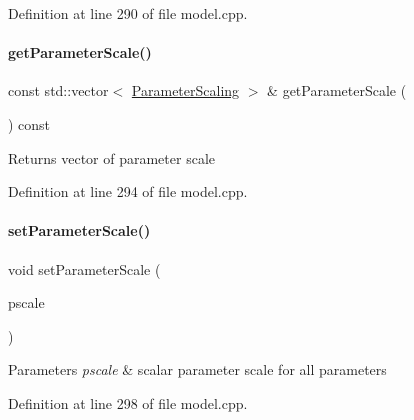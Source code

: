 Definition at line 290 of file model.\+cpp.

\mbox{\label{classamici_1_1_model_ab14620b22a79748a09a88b9311a7f6d5}} 
\paragraph{\texorpdfstring{get\+Parameter\+Scale()}{getParameterScale()}}
{\footnotesize\ttfamily const std\+::vector$<$ \mbox{\hyperlink{namespaceamici_a42f062082226e9284c201d9eab71a3a0}{Parameter\+Scaling}} $>$ \& get\+Parameter\+Scale (\begin{DoxyParamCaption}{ }\end{DoxyParamCaption}) const}

\begin{DoxyReturn}{Returns}
vector of parameter scale 
\end{DoxyReturn}


Definition at line 294 of file model.\+cpp.

\mbox{\label{classamici_1_1_model_a7e25febbfd9db80f64a4f73a2718bda7}} 
\paragraph{\texorpdfstring{set\+Parameter\+Scale()}{setParameterScale()}\hspace{0.1cm}{\footnotesize\ttfamily [1/2]}}
{\footnotesize\ttfamily void set\+Parameter\+Scale (\begin{DoxyParamCaption}\item[{\mbox{\hyperlink{namespaceamici_a42f062082226e9284c201d9eab71a3a0}{Parameter\+Scaling}}}]{pscale }\end{DoxyParamCaption})}


\begin{DoxyParams}{Parameters}
{\em pscale} & scalar parameter scale for all parameters \\
\hline
\end{DoxyParams}


Definition at line 298 of file model.\+cpp.

